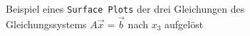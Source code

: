 \begin{figure}[H]
    \centering
    
    \caption{Beispiel eines \texttt{Surface Plots} der drei Gleichungen des Gleichungssystems $A\vec{x} = \vec{b}$ nach $x_3$ aufgelöst}\label{fig:SurfPlot}
\end{figure}
